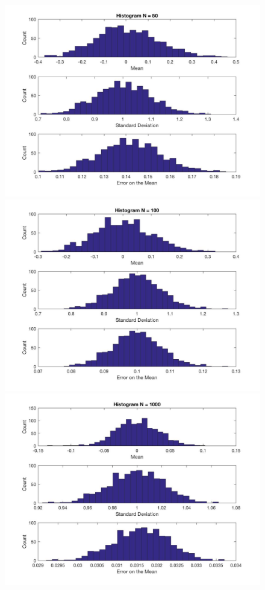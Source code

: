 \documentclass{article}
\begin{document}
\begin{enumerate}
\begin{figure}[H]
    \includegraphics[scale = 0.2]{3c.jpg}
    \includegraphics[scale = 0.2]{3d.jpg}
    \includegraphics[scale = 0.2]{3e.jpg}

\end{figure}
\end{enumerate}
\end{document}
